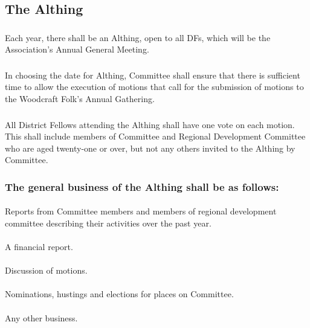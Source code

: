 \documentclass[a4paper, 12pt]{article}
\begin{document}
\subsection{The Althing}
\label{sec:althing}
\subsubsection{}
Each year, there shall be an Althing, open to all DFs, which will be the  Association’s Annual General Meeting.
\subsubsection{}
In choosing the date for Althing, Committee shall ensure that there is sufficient time to allow the execution of motions that call for the submission of motions to the Woodcraft Folk’s Annual Gathering.
\subsubsection{}
All District Fellows attending the Althing shall have one vote on each motion.  This shall include members of Committee and Regional Development Committee who are aged twenty-one or over, but not any others invited to the Althing by Committee.
\subsubsection{The general business of the Althing shall be as follows:}
\paragraph{}
Reports from Committee members and members of regional development committee describing their activities over the past year.
\paragraph{}
A financial report.
\paragraph{}
Discussion of motions.
\paragraph{}
Nominations, hustings and elections for places on Committee.
\paragraph{}
Any other business.
\end{document}
